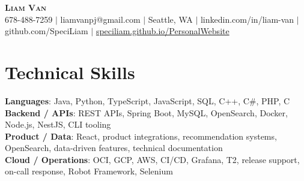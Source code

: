 \documentclass[letterpaper,11pt]{article}
\begin{document}

%
\begin{center}
    \textbf{\Huge \scshape Liam Van} \\ \vspace{1pt}
    \small 678-488-7259 $|$ \small {liamvanpj@gmail.com} $|$ Seattle, WA
 {{$|$ linkedin.com/in/liam-van} {$|$ github.com/SpeciLiam} {$|$ \href{https://speciliam.github.io/PersonalWebsite}{speciliam.github.io/PersonalWebsite}}}

\end{center}

\section{Technical Skills}
 \begin{itemize}[leftmargin=0.15in, label={}]
    \small{\item{
     \textbf{Languages}{: Java, Python, TypeScript, JavaScript, SQL, C++, C\#, PHP, C} \\
     \textbf{Backend / APIs}{: REST APIs, Spring Boot, MySQL, OpenSearch, Docker, Node.js, NestJS, CLI tooling} \\
     \textbf{Product / Data}{: React, product integrations, recommendation systems, OpenSearch, data-driven features, technical documentation} \\
     \textbf{Cloud / Operations}{: OCI, GCP, AWS, CI/CD, Grafana, T2, release support, on-call response, Robot Framework, Selenium} \\
    }}
 \end{itemize}
%
\end{document}
